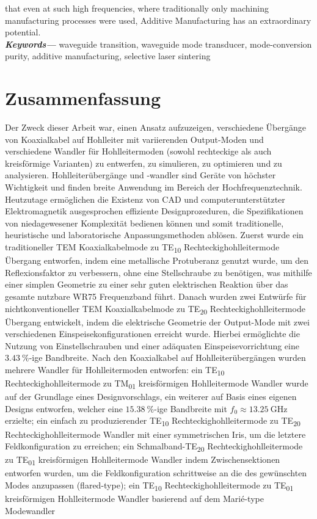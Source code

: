 \documentclass[english,twoside]{article}
\providecommand{\keywords}[1]
{
  {\small	
  \textbf{\textit{Keywords---}} #1}
}
\begin{document}
that even at such high frequencies, where traditionally only machining manufacturing processes were used, Additive Manufacturing has an extraordinary potential.\\

	
	\keywords{waveguide transition, waveguide mode transducer, mode-conversion purity, additive manufacturing, selective laser sintering}\\

	\newpage
	\section*{Zusammenfassung}
		
		Der Zweck dieser Arbeit war, einen Ansatz aufzuzeigen, verschiedene Übergänge von Koaxialkabel auf Hohlleiter mit variierenden Output-Moden und verschiedene Wandler für Hohlleitermoden (sowohl rechteckige als auch kreisförmige Varianten) zu entwerfen, zu simulieren, zu optimieren und zu analysieren. Hohlleiterübergänge und -wandler sind Geräte von höchster Wichtigkeit und finden breite Anwendung im Bereich der Hochfrequenztechnik. Heutzutage ermöglichen die Existenz von CAD und computerunterstützter Elektromagnetik ausgesprochen effiziente Designprozeduren, die Spezifikationen von niedagewesener Komplexität bedienen können und somit traditionelle, heuristische und laboratorische Anpassungsmethoden ablösen. Zuerst wurde ein traditioneller \ac{TEM} Koaxialkabelmode zu \ac{TE}\textsubscript{10} Rechteckighohlleitermode Übergang entworfen, indem eine metallische Protuberanz genutzt wurde, um den Reflexionsfaktor zu verbessern, ohne eine Stellschraube zu benötigen, was mithilfe einer simplen Geometrie zu einer sehr guten elektrischen Reaktion über das gesamte nutzbare \ac{WR}75 Frequenzband führt. Danach wurden zwei Entwürfe für nichtkonventioneller  \ac{TEM} Koaxialkabelmode zu \ac{TE}\textsubscript{20} Rechteckighohlleitermode Übergang entwickelt, indem die elektrische Geometrie der Output-Mode mit zwei verschiedenen Einspeisekonfigurationen erreicht wurde. Hierbei ermöglichte die Nutzung von Einstellschrauben und einer adäquaten Einspeisevorrichtung eine $\SI{3.43}{\percent}$-ige Bandbreite. Nach den Koaxialkabel auf Hohlleiterübergängen wurden mehrere Wandler für Hohlleitermoden entworfen: ein \ac{TE}\textsubscript{10} Rechteckighohlleitermode zu \ac{TM}\textsubscript{01} kreisförmigen Hohlleitermode Wandler wurde auf der Grundlage eines  Designvorschlags, ein weiterer auf Basis eines eigenen Designs entworfen, welcher eine $\SI{15.38}{\percent}$-ige Bandbreite mit $f_0\approx\SI{13.25}{\giga\hertz}$ erzielte; ein einfach zu produzierender  \ac{TE}\textsubscript{10} Rechteckighohlleitermode zu  \ac{TE}\textsubscript{20} Rechteckighohlleitermode Wandler mit einer symmetrischen Iris, um die letztere Feldkonfiguration zu erreichen; ein Schmalband-\ac{TE}\textsubscript{20} Rechteckighohlleitermode zu TE\textsubscript{01} kreisförmigen Hohlleitermode Wandler indem Zwischensektionen entworfen wurden, um die Feldkonfiguration schrittweise an die des gewünschten Modes anzupassen (flared-type); ein \ac{TE}\textsubscript{10} Rechteckighohlleitermode zu \ac{TE}\textsubscript{01} kreisförmigen Hohlleitermode Wandler basierend auf dem Marié-type Modewandler 
\end{document}
